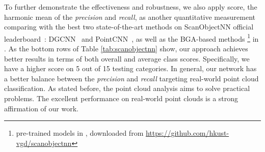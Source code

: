 \documentclass[journal,twoside]{IEEEtran}
\begin{document}
To further demonstrate the effectiveness and robustness, we also apply  score, the harmonic mean of the \emph{precision} and \emph{recall}, as another quantitative measurement comparing with the best two state-of-the-art methods on ScanObjectNN official leaderboard~\cite{scanWeb}: DGCNN~\cite{wang2019dynamic} and PointCNN~\cite{li2018pointcnn}, as well as the BGA-based methods \footnote{pre-trained models in \cite{Uy_2019_ICCV}, downloaded from \url{https://github.com/hkust-vgd/scanobjectnn}} in \cite{Uy_2019_ICCV}. As the bottom rows of Table \ref{tab:scanobjectnn} show, our approach achieves better results in terms of both overall and average class  scores. Specifically, we have a higher  score on 5 out of 15 testing categories. In general, our network has a better balance between the \emph{precision} and \emph{recall} targeting real-world point cloud classification. As stated before, the point cloud analysis aims to solve practical problems. The excellent performance on real-world point clouds is a strong affirmation of our work.

\begin{table}
\begin{center}
\caption{Classification accuracy (\%) for various \emph{Attention} modules on \emph{ModelNet40}. (\emph{SE} and \emph{Non-local} are adapted from the 2D case by letting the 3D point space be equal to the 2D spatial space.  is the number of points, and  is the number of channels. Commonly in deep learning-based point cloud networks,  is much larger than .)}
\end{center}
\end{table}
\end{document}
